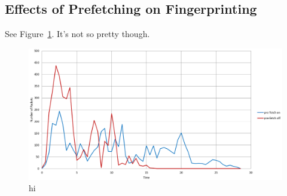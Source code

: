 \subsection{Effects of Prefetching on Fingerprinting}


See Figure~\ref{fig:prefetch}. It's not so pretty though.
\begin{figure}[h]
\includegraphics[width=\columnwidth]{figures/prefetch.png}
\centering
\caption{hi}
\label{fig:prefetch}
\end{figure}


